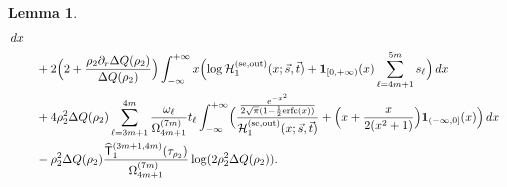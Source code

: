 \documentclass[a4paper]{article}
\newtheorem{lemma}[theorem]{Lemma}
\newcommand{\erfc}{{\rm erfc}}
\numberwithin{equation}{section}
\begin{document}
\begin{lemma}
\begin{align*}
\,dx
\\
&\quad 
+2\Bigl(2+\frac{\rho_2\partial_r\Delta Q(\rho_2)}{\Delta Q(\rho_2)}\Bigr)
\int_{-\infty}^{+\infty}
x
\Bigl( \log \mathcal{H}_{1}^{(\mathrm{se},\mathrm{out})}
(x;\vec{s},\vec{t})
+\mathbf{1}_{[0,+\infty)}(x)\sum_{\ell=4m+1}^{5m}s_{\ell}\Bigr)
\,dx
\\
&\quad 
+
4\rho_2^2\Delta Q(\rho_2)
\sum_{\ell=3m+1}^{4m}
\frac{\omega_{\ell}}{\Omega_{4m+1}^{(7m)}}t_{\ell}
\int_{-\infty}^{+\infty}
\Bigl( 
\frac{\frac{e^{-x^2}}{2\sqrt{\pi}(1-\frac{1}{2}\erfc(x))}}{\mathcal{H}_{1}^{(\mathrm{se},\mathrm{out})}
(x;\vec{s},\vec{t})}
+
\Bigl(x+\frac{x}{2(x^2+1)}\Bigr)\mathbf{1}_{(-\infty,0]}(x)
\Bigr)\,dx
\\
&\quad 
-\rho_2^2\Delta Q(\rho_2)\frac{\widehat{\mathsf{T}}_1^{(3m+1,4m)}(\tau_{\rho_2})}{\Omega_{4m+1}^{(7m)}}
\log (2\rho_2^2\Delta Q(\rho_2)).
\end{align*}
\end{lemma}
\end{document}

